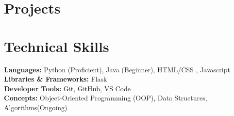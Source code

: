 \documentclass[letterpaper,11pt]{article}
\makeatletter
\newcommand{\resumeItem}[1]{
  \item\small{
    {#1 \vspace{-2pt}}
  }
}
\newcommand{\resumeProjectHeading}[2]{
    \item
    \begin{tabular*}{0.97\textwidth}{l@{\extracolsep{\fill}}r}
      \small#1 & #2 \\
    \end{tabular*}\vspace{-7pt}
}
\newcommand{\resumeSubHeadingListStart}{\begin{itemize}[leftmargin=0.15in, label={}]}
\newcommand{\resumeSubHeadingListEnd}{\end{itemize}}
\newcommand{\resumeItemListStart}{\begin{itemize}}
\newcommand{\resumeItemListEnd}{\end{itemize}\vspace{-5pt}}
\makeatother
\begin{document}
\section{Projects}





\section{Technical Skills}
\begin{itemize}[leftmargin=0.15in, label={}]
    {\item{
       
        \textbf{Languages:} Python (Proficient), Java (Beginner), HTML/CSS , Javascript\\
        \textbf{Libraries \& Frameworks:} Flask\\
        \textbf{Developer Tools:} Git, GitHub, VS Code\\
        \textbf{Concepts:} Object-Oriented Programming (OOP), Data Structures, Algorithms(Ongoing)\\
        
    }}
\end{itemize}
\end{document}
